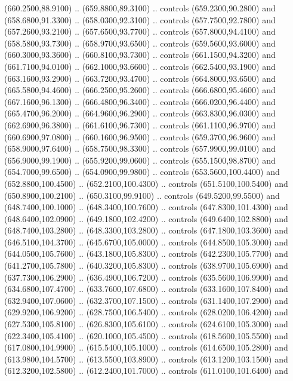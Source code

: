 {\begin{scope}[y=0.80pt, x=0.80pt, yscale=-1, xscale=1, inner sep=0pt, outer sep=0pt, #1]
      (660.2500,88.9100) .. (659.8800,89.3100) .. controls (659.2300,90.2800) and
      (658.6800,91.3300) .. (658.0300,92.3100) .. controls (657.7500,92.7800) and
      (657.2600,93.2100) .. (657.6500,93.7700) .. controls (657.8000,94.4100) and
      (658.5800,93.7300) .. (658.9700,93.6500) .. controls (659.5600,93.6000) and
      (660.3000,93.3600) .. (660.8100,93.7300) .. controls (661.1500,94.3200) and
      (661.7100,94.0100) .. (662.1000,93.6600) .. controls (662.5400,93.1900) and
      (663.1600,93.2900) .. (663.7200,93.4700) .. controls (664.8000,93.6500) and
      (665.5800,94.4600) .. (666.2500,95.2600) .. controls (666.6800,95.4600) and
      (667.1600,96.1300) .. (666.4800,96.3400) .. controls (666.0200,96.4400) and
      (665.4700,96.2000) .. (664.9600,96.2900) .. controls (663.8300,96.0300) and
      (662.6900,96.3800) .. (661.6100,96.7300) .. controls (661.1100,96.9700) and
      (660.6900,97.0800) .. (660.1600,96.9500) .. controls (659.3700,96.9600) and
      (658.9000,97.6400) .. (658.7500,98.3300) .. controls (657.9900,99.0100) and
      (656.9000,99.1900) .. (655.9200,99.0600) .. controls (655.1500,98.8700) and
      (654.7000,99.6500) .. (654.0900,99.9800) .. controls (653.5600,100.4400) and
      (652.8800,100.4500) .. (652.2100,100.4300) .. controls (651.5100,100.5400) and
      (650.8900,100.2100) .. (650.3100,99.9100) .. controls (649.5200,99.5500) and
      (648.7400,100.1000) .. (648.3400,100.7600) .. controls (647.8300,101.4300) and
      (648.6400,102.0900) .. (649.1800,102.4200) .. controls (649.6400,102.8800) and
      (648.7400,103.2800) .. (648.3300,103.2800) .. controls (647.1800,103.3600) and
      (646.5100,104.3700) .. (645.6700,105.0000) .. controls (644.8500,105.3000) and
      (644.0500,105.7600) .. (643.1800,105.8300) .. controls (642.2300,105.7700) and
      (641.2700,105.7800) .. (640.3200,105.8300) .. controls (638.9700,105.6900) and
      (637.7300,106.2900) .. (636.4900,106.7200) .. controls (635.5600,106.9900) and
      (634.6800,107.4700) .. (633.7600,107.6800) .. controls (633.1600,107.8400) and
      (632.9400,107.0600) .. (632.3700,107.1500) .. controls (631.1400,107.2900) and
      (629.9200,106.9200) .. (628.7500,106.5400) .. controls (628.0200,106.4200) and
      (627.5300,105.8100) .. (626.8300,105.6100) .. controls (624.6100,105.3000) and
      (622.3400,105.4100) .. (620.1000,105.4500) .. controls (618.5600,105.5500) and
      (617.0800,104.9900) .. (615.5400,105.1000) .. controls (614.6500,105.2800) and
      (613.9800,104.5700) .. (613.5500,103.8900) .. controls (613.1200,103.1500) and
      (612.3200,102.5800) .. (612.2400,101.7000) .. controls (611.0100,101.6400) and

\end{scope}}
